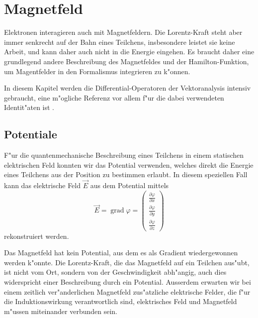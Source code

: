 \chapter{Magnetfeld\label{chapter:magnetfeld}}
\rhead{}
Elektronen interagieren auch mit Magnetfeldern. Die Lorentz-Kraft
steht aber immer senkrecht auf der Bahn eines Teilchens, insbesondere
leistet sie keine Arbeit, und kann daher auch nicht in die Energie
eingehen.
Es braucht daher eine grundlegend andere Beschreibung des Magnetfeldes
und der Hamilton-Funktion, um Magentfelder in den Formalismus
integrieren zu k"onnen.

In diesem Kapitel werden die Differential-Operatoren der Vektoranalysis
intensiv gebraucht, eine m"ogliche Referenz vor allem f"ur die
dabei verwendeten Identit"aten ist \cite{skript:vektoranalysis}.

\section{Potentiale\label{section:vektorpotential}}
F"ur die quantenmechanische Beschreibung eines Teilchens in einem
statischen elektrischen Feld konnten wir das Potential verwenden, welches
direkt die Energie eines Teilchens aus der Position zu bestimmen
erlaubt. In diesem speziellen Fall kann das
elektrische Feld $\vec E$ aus dem Potential mittels
\[
\vec E=\operatorname{grad}\varphi
=
\begin{pmatrix}
\frac{\partial\varphi}{\partial x}\\
\frac{\partial\varphi}{\partial y}\\
\frac{\partial\varphi}{\partial z}
\end{pmatrix}
\]
rekonstruiert werden.

Das Magnetfeld hat kein Potential, aus dem es als Gradient wiedergewonnen
werden k"onnte.
Die Lorentz-Kraft, die das Magnetfeld
auf ein Teilchen aus"ubt, ist nicht vom Ort, sondern von der Geschwindigkeit
abh"angig, auch dies widerspricht einer Beschreibung durch ein Potential.
Ausserdem erwarten wir bei einem zeitlich ver"anderlichen Magnetfeld
zus"atzliche elektrische Felder, die f"ur die Induktionswirkung verantwortlich
sind,
elektrisches Feld und Magnetfeld m"ussen miteinander verbunden sein.

